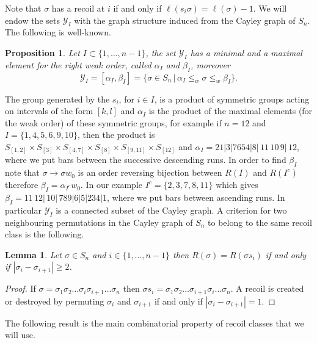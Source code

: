 \documentclass[11pt,a4paper]{amsart}
\newtheorem{lemma}[theorem]{Lemma}
\newtheorem{proposition}[theorem]{Proposition}
\theoremstyle{contraction}
\begin{document}
 Note that $\sigma$ has a recoil at $i$ if and only if $\ell(s_i\sigma )=\ell(\sigma)-1$. 
We will endow the sets ${\mathcal Y}_I$ with the graph structure induced from the Cayley graph of $S_n$.
The following is well-known.
\begin{proposition}\label{recoilclass}
Let $I\subset \{1,\ldots,n-1\}$, 
the set ${\mathcal Y}_I$ has a minimal and a maximal element for the right weak order, called 
$\alpha_I$ and $\beta_I$, moreover
$${\mathcal Y}_I=[\alpha_I,\beta_I]=\{\sigma\in S_n\,|\,\alpha_I\leq_w\sigma\leq_w\beta_I\}.$$

\end{proposition}
 The group generated by the $s_i$,  for $i\in I$, is a product of symmetric groups acting on intervals of the form $[k,l]$ and $\alpha_I$ is the product of the maximal elements (for the weak order) of these symmetric groups, for example if $n=12$ and $I=\{1,4,5,6,9,10\}$, then the product is $S_{[1,2]}\times S_{[3]}\times S_{[4,7]}\times S_{[8]}\times S_{[9,11]}\times S_{[12]}$ and 
$\alpha_I=21|3|7654|8|\,11\, 10\, 9|\,12$, where we put bars between the successive descending runs. In order to find $\beta_I$ note that $\sigma\to \sigma w_0$ is an order reversing
 bijection between $R(I)$ and $R(I^{c})$ therefore $\beta_I=\alpha_{I^c}w_0$. In our example $I^c=\{2,3,7,8,11\}$ which gives
 $\beta _I=11\,12|\,10|\,789|6|5|234|1$, where we put bars between ascending runs.
 In particular ${\mathcal Y}_I$ is a connected subset of  the Cayley graph.
A criterion for two neighbouring permutations in the Cayley graph of $S_n$ to belong to the same recoil class is the following.
\begin{lemma}\label{>2}
Let $\sigma\in S_n$ and  $i\in\{1,\ldots,n-1\}$ then 
$R(\sigma)=R(\sigma s_i)$
 if and only if
$|\sigma_i-\sigma_{i+1}|\geq 2$.
\end{lemma}
\begin{proof} 
If $\sigma=\sigma_1\sigma_2\ldots\sigma_i\sigma_{i+1}\ldots\sigma_n$ then $\sigma s_i=\sigma_1\sigma_2\ldots\sigma_{i+1}\sigma_i\ldots\sigma_n$. 
A recoil is created or destroyed by permuting 
$\sigma_i$ and $\sigma_{i+1}$ if and only if 
$|\sigma_i-\sigma_{i+1}|=1$.
\end{proof}
 The following result is the main combinatorial property of recoil classes that we will use.
\end{document}
